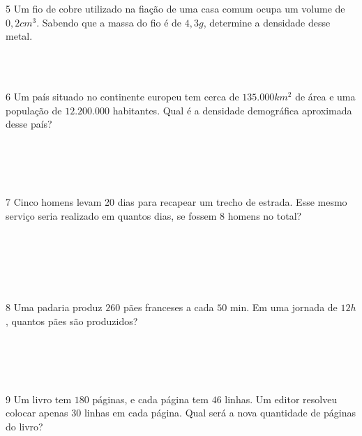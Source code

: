 {{\num{5} Um fio de cobre utilizado na fiação de uma casa comum ocupa um volume
de $0,2 cm^3$. Sabendo que a massa do fio é de $4,3 g$, determine a densidade
desse metal.

\\
\\

\pagebreak

\num{6} Um país situado no continente europeu tem cerca de $135.000 km^2$ de
área e uma população de $12.200.000$ habitantes. Qual é a densidade
demográfica aproximada desse país?

\\
\\
\\
\\

\num{7} Cinco homens levam 20 dias para recapear um trecho de estrada. Esse
mesmo serviço seria realizado em quantos dias, se fossem 8 homens no
total?

\\
\\
\\
\\
\\

\num{8} Uma padaria produz $260$ pães franceses a cada $50$ min. Em uma jornada
de $12 h$, quantos pães são produzidos?

\\
\\
\\
\\

\num{9} Um livro tem $180$ páginas, e cada página tem $46$ linhas. Um editor
resolveu colocar apenas $30$ linhas em cada página. Qual será a nova
quantidade de páginas do livro?

\\
\\
\\
\\
\\

}}

